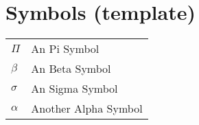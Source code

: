 \chapter*{\centering Symbols (template)}
\begin{spacing}{1.5}
\setlength{\parskip}{0.3in}

\begin{table}[ht]
\centering
\begin{tabular}{ll}
\textbf{$\Pi$} & An Pi Symbol\\
\textbf{$\beta$} & An Beta Symbol\\
\textbf{$\sigma$} & An Sigma Symbol\\
\textbf{$\alpha$} & Another Alpha Symbol\\
\end{tabular}%
\end{table}

\end{spacing}
\newpage
